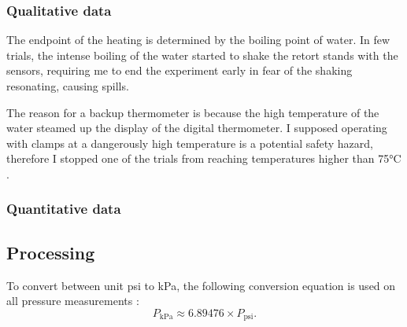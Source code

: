 \documentclass[a4paper,12pt]{article}
\begin{document}
\subsubsection*{Qualitative data}
The endpoint of the heating is determined by the boiling point of water. In few trials, the intense boiling of the water started to shake the retort stands with the sensors, requiring me to end the experiment early in fear of the shaking resonating, causing spills.

The reason for a backup thermometer is because the high temperature of the water steamed up the display of the digital thermometer. I supposed operating with clamps at a dangerously high temperature is a potential safety hazard, therefore I stopped one of the trials from reaching temperatures higher than 75$\si{\celsius}$.

\subsubsection*{Quantitative data}
\begin{figure}[H]
    \centering
\end{figure}

\subsection{Processing}
To convert between unit psi to kPa, the following conversion equation is used on all pressure measurements \parencite{conver_units}:
\[
    P_{\text{kPa}} \approx 6.89476 \times P_{\text{psi}}.
\]
\end{document}
